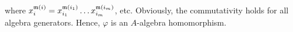 where $x_i^{\mathfrak{m}(i)} = x_{i_1}^{\mathfrak{m}(i_1)} \ldots x_{i_m}^{\mathfrak{m}(i_m)}$, etc. Obviously, the commutativity holds for all algebra generators. Hence, $\varphi$ is an $A$-algebra homomorphism.
